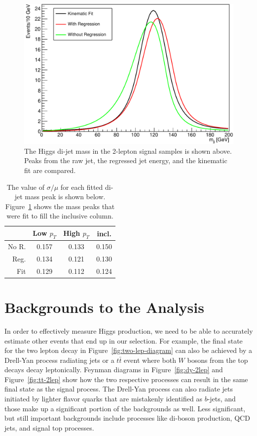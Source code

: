 \begin{figure}
  \includegraphics[width=\linewidth]{figures/fits_SR_medhigh_Hmass__.pdf}
  \caption[Higgs di-jet mass fit with kinematic fit]{
    The Higgs di-jet mass in the 2-lepton signal samples is shown above.
    Peaks from the raw jet, the regressed jet energy, and the kinematic fit are compared.
  }
  \label{fig:kinfit}
\end{figure}

\begin{table}
  \centering
  \caption[Mass resolutions after kinematic fit]{
    The value of $\sigma/\mu$ for each fitted di-jet mass peak is shown below.
    Figure~\ref{fig:kinfit} shows the mass peaks that were fit to fill the inclusive column.
  }
  \begin{tabular}{|r|c|c|c|}
    \hline
    & Low $p_T$ & High $p_T$ & incl. \\
    \hline
    No R. & 0.157 & 0.133 & 0.150 \\
    Reg.  & 0.134 & 0.121 & 0.130 \\
    Fit   & 0.129 & 0.112 & 0.124 \\
    \hline
  \end{tabular}
  \label{tab:kinfit}
\end{table}

\section{Backgrounds to the Analysis}

In order to effectively measure Higgs production,
we need to be able to accurately estimate other events
that end up in our selection.
For example, the final state for the two lepton decay in Figure~\ref{fig:two-lep-diagram}
can also be achieved by a Drell-Yan process radiating jets
or a $t\bar{t}$ event where both $W$ bosons from the top decays decay leptonically.
Feynman diagrams in Figure~\ref{fig:dy-2lep} and Figure~\ref{fig:tt-2lep}
show how the two respective processes can result in
the same final state as the signal process.
The Drell-Yan process can also radiate jets initiated by lighter flavor quarks
that are mistakenly identified as $b$-jets,
and those make up a significant portion of the backgrounds as well.
Less significant, but still important backgrounds include processes like
di-boson production, QCD jets, and signal top processes.

